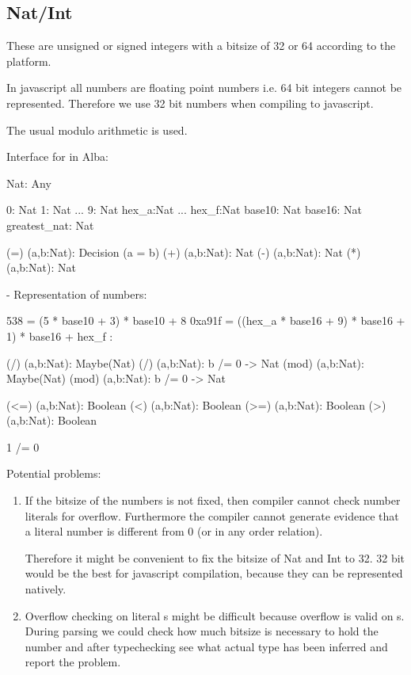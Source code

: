 \subsection{Nat/Int}

These are unsigned or signed integers with a bitsize of 32 or 64 according to
the platform.

In javascript all numbers are floating point numbers i.e. 64 bit
integers cannot be represented. Therefore we use 32 bit numbers when compiling
to javascript.

The usual modulo arithmetic is used.

Interface for  in Alba:
%
\begin{alba}
    Nat: Any

    0: Nat
    1: Nat
    ...
    9: Nat
    hex_a:Nat
    ...
    hex_f:Nat
    base10:   Nat
    base16:   Nat
    greatest_nat: Nat

    (=) (a,b:Nat): Decision (a = b)
    (+) (a,b:Nat): Nat
    (-) (a,b:Nat): Nat
    (*) (a,b:Nat): Nat

    {- Representation of numbers:

      538    =  (5 * base10 + 3) * base10 + 8
      0xa91f =  ((hex_a * base16 + 9) * base16 + 1) * base16 + hex_f
    :}

    (/) (a,b:Nat): Maybe(Nat)
    (/) (a,b:Nat): b /= 0 -> Nat
    (mod) (a,b:Nat): Maybe(Nat)
    (mod) (a,b:Nat): b /= 0 -> Nat

    (<=) (a,b:Nat): Boolean
    (<)  (a,b:Nat): Boolean
    (>=) (a,b:Nat): Boolean
    (>)  (a,b:Nat): Boolean

    1 /= 0
\end{alba}


Potential problems:
\begin{enumerate}
\item If the bitsize of the numbers is not fixed, then compiler cannot check
  number literals for overflow. Furthermore the compiler cannot generate
  evidence that a literal number is different from 0 (or in any order
  relation).

  Therefore it might be convenient to fix the bitsize of Nat and Int to 32. 32
  bit would be the best for javascript compilation, because they can be
  represented natively.


\item Overflow checking on literal s might be difficult because
  overflow is valid on s. During parsing we could check how much
  bitsize is necessary to hold the number and after typechecking see what
  actual type has been inferred and report the problem.
\end{enumerate}








